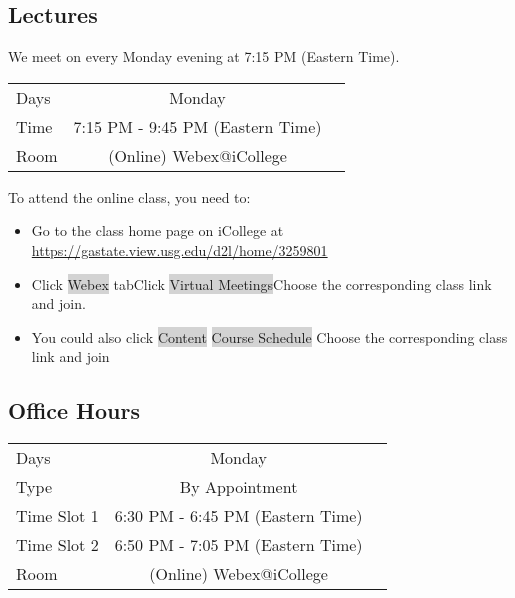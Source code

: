 \documentclass[a4paper, 12pt]{article}
\begin{document}
\subsection{Lectures}
We meet on every Monday evening at 7:15 PM (Eastern Time).
\begin{center}
  \begin{tabular}{ l | c r }
    \hline			
    Days & Monday\\
   Time & 7:15 PM - 9:45 PM (Eastern Time) \\
    Room & (Online) Webex@iCollege\\
    \hline  
  \end{tabular}
\end{center}
\begin{flushleft}
To attend the online class, you need to:
\begin{itemize}
  \item Go to the class home page on iCollege at \url{https://gastate.view.usg.edu/d2l/home/3259801}
  \item Click \colorbox{lightgray}{Webex} tab\textrightarrow Click \colorbox{lightgray}{Virtual Meetings}\textrightarrow Choose the corresponding class link and join.
  \item You could also click \colorbox{lightgray}{Content} \colorbox{lightgray}{Course Schedule} \textrightarrow Choose the corresponding class link and join
\end{itemize}
\end{flushleft}

\subsection{Office Hours}
\begin{center}
  \begin{tabular}{ l | c r }
    \hline			
    Days & Monday\\
    Type & By Appointment\\
    Time Slot 1 & 6:30 PM - 6:45 PM (Eastern Time) \\
    Time Slot 2 & 6:50 PM - 7:05 PM (Eastern Time) \\
    Room & (Online) Webex@iCollege\\
    \hline  
  \end{tabular}
\end{center}
\end{document}
